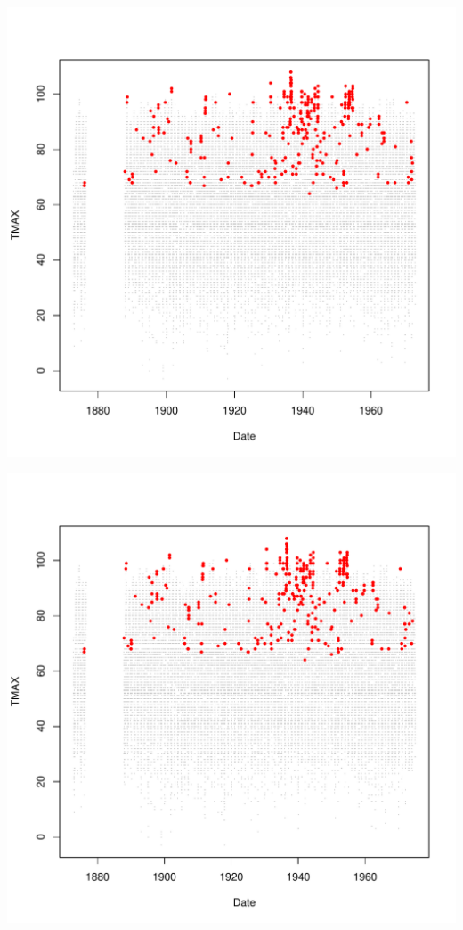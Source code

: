 \documentclass{article}\usepackage[]{graphicx}\usepackage[]{color}
\makeatletter
\def\maxwidth{ %
  \ifdim\Gin@nat@width>\linewidth
    \linewidth
  \else
    \Gin@nat@width
  \fi
}
\newenvironment{knitrout}{}{} %
\makeatother
\begin{document}
\begin{knitrout}
\includegraphics[width=\maxwidth]{figure/unnamed-chunk-4-46} 

\includegraphics[width=\maxwidth]{figure/unnamed-chunk-4-47} 


\end{knitrout}
\end{document}
